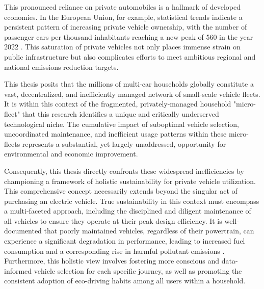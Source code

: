 \textgap

This pronounced reliance on private automobiles is a hallmark of developed economies. In the European Union, for example, statistical trends indicate a persistent pattern of increasing private vehicle ownership, with the number of passenger cars per thousand inhabitants reaching a new peak of 560 in the year 2022 \cite{passengers-cars-per-thousand-people}. This saturation of private vehicles not only places immense strain on public infrastructure but also complicates efforts to meet ambitious regional and national emissions reduction targets.

\textgap

This thesis posits that the millions of multi-car households globally constitute a vast, decentralized, and inefficiently managed network of small-scale vehicle fleets. It is within this context of the fragmented, privately-managed household "micro-fleet" that this research identifies a unique and critically underserved technological niche. The cumulative impact of suboptimal vehicle selection, uncoordinated maintenance, and inefficient usage patterns within these micro-fleets represents a substantial, yet largely unaddressed, opportunity for environmental and economic improvement.

\textgap

Consequently, this thesis directly confronts these widespread inefficiencies by championing a framework of holistic sustainability for private vehicle utilization. This comprehensive concept necessarily extends beyond the singular act of purchasing an electric vehicle. True sustainability in this context must encompass a multi-faceted approach, including the disciplined and diligent maintenance of all vehicles to ensure they operate at their peak design efficiency. It is well-documented that poorly maintained vehicles, regardless of their powertrain, can experience a significant degradation in performance, leading to increased fuel consumption and a corresponding rise in harmful pollutant emissions \cite{iea2021fuel}. Furthermore, this holistic view involves fostering more conscious and data-informed vehicle selection for each specific journey, as well as promoting the consistent adoption of eco-driving habits among all users within a household.

\textgap

